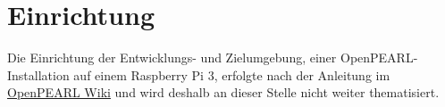 \chapter{Einrichtung}
Die Einrichtung der Entwicklungs- und Zielumgebung, einer OpenPEARL-Installation auf einem Raspberry Pi 3, erfolgte nach der Anleitung im \href{https://sourceforge.net/p/openpearl/wiki/}{OpenPEARL Wiki} und wird deshalb an dieser Stelle nicht weiter thematisiert.